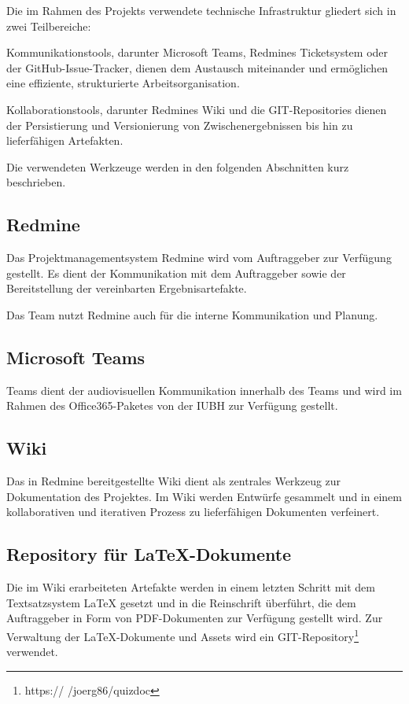 \documentclass[a4paper,11pt,listof=numbered,glossary=totoc,parskip=half,toc=bib]{scrreprt}
\begin{document}
{Die im Rahmen des Projekts verwendete technische Infrastruktur gliedert sich in zwei Teilbereiche:

Kommunikationstools, darunter Microsoft Teams, Redmines Ticketsystem oder der GitHub-Issue-Tracker, dienen dem Austausch miteinander und ermöglichen eine effiziente, strukturierte Arbeitsorganisation.

Kollaborationstools, darunter Redmines Wiki und die GIT-Repositories dienen der Persistierung und Versionierung von Zwischenergebnissen bis hin zu lieferfähigen Artefakten.

Die verwendeten Werkzeuge werden in den folgenden Abschnitten kurz beschrieben.

\subsection{Redmine}

Das Projektmanagementsystem Redmine wird vom Auftraggeber zur Verfügung gestellt.
Es dient der Kommunikation mit dem Auftraggeber sowie der Bereitstellung der vereinbarten Ergebnisartefakte.

Das Team nutzt Redmine auch für die interne Kommunikation und Planung.

\subsection{Microsoft Teams}

Teams dient der audiovisuellen Kommunikation innerhalb des Teams und wird im Rahmen des Office365-Paketes von der IUBH zur Verfügung gestellt.

\subsection{Wiki}

Das in Redmine bereitgestellte Wiki dient als zentrales Werkzeug zur Dokumentation des Projektes.
Im Wiki werden Entwürfe gesammelt und in einem kollaborativen und iterativen Prozess zu lieferfähigen Dokumenten verfeinert.

\subsection{Repository für LaTeX-Dokumente}

Die im Wiki erarbeiteten Artefakte werden in einem letzten Schritt mit dem Textsatzsystem LaTeX gesetzt und in die Reinschrift überführt, die dem Auftraggeber in Form von PDF-Dokumenten zur Verfügung gestellt wird.
Zur Verwaltung der LaTeX-Dokumente und Assets wird ein GIT-Repository\footnote{https://
/joerg86/quizdoc} verwendet.

}
\end{document}

